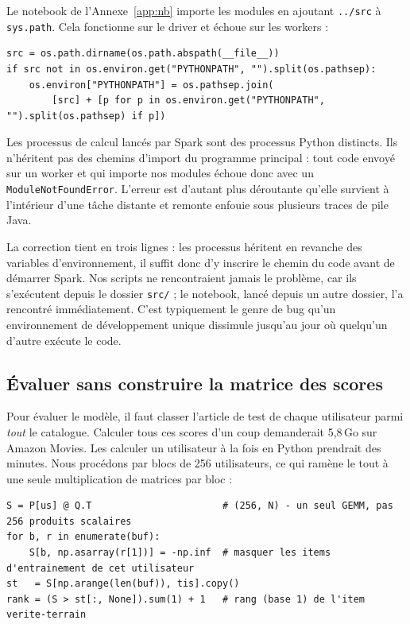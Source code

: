 \documentclass[11pt,a4paper]{article}
\begin{document}
Le notebook de l'Annexe~\ref{app:nb} importe les modules en ajoutant \texttt{../src}
à \texttt{sys.path}. Cela fonctionne sur le driver et échoue sur les workers :

\begin{lstlisting}[caption={\texttt{spark\_utils.get\_spark} - trois lignes sans
lesquelles rien ne fonctionne en dehors de \texttt{src/}.}]
src = os.path.dirname(os.path.abspath(__file__))
if src not in os.environ.get("PYTHONPATH", "").split(os.pathsep):
    os.environ["PYTHONPATH"] = os.pathsep.join(
        [src] + [p for p in os.environ.get("PYTHONPATH", "").split(os.pathsep) if p])
\end{lstlisting}

Les processus de calcul lancés par Spark sont des processus Python distincts. Ils
n'héritent pas des chemins d'import du programme principal : tout code envoyé sur un
worker et qui importe nos modules échoue donc avec un \texttt{ModuleNotFoundError}.
L'erreur est d'autant plus déroutante qu'elle survient à l'intérieur d'une tâche
distante et remonte enfouie sous plusieurs traces de pile Java.

La correction tient en trois lignes : les processus héritent en revanche des variables
d'environnement, il suffit donc d'y inscrire le chemin du code avant de démarrer Spark.
Nos scripts ne rencontraient jamais le problème, car ils s'exécutent depuis le dossier
\texttt{src/} ; le notebook, lancé depuis un autre dossier, l'a rencontré
immédiatement. C'est typiquement le genre de bug qu'un environnement de développement
unique dissimule jusqu'au jour où quelqu'un d'autre exécute le code.

\subsection{Évaluer sans construire la matrice des scores}

Pour évaluer le modèle, il faut classer l'article de test de chaque utilisateur parmi
\emph{tout} le catalogue. Calculer tous ces scores d'un coup demanderait 5,8\,Go sur
Amazon Movies. Les calculer un utilisateur à la fois en Python prendrait des minutes.
Nous procédons par blocs de 256 utilisateurs, ce qui ramène le tout à une seule
multiplication de matrices par bloc :

\begin{lstlisting}[caption={\texttt{evaluate.\_block\_eval} - classement sur le
catalogue entier, par blocs.}]
S = P[us] @ Q.T                       # (256, N) - un seul GEMM, pas 256 produits scalaires
for b, r in enumerate(buf):
    S[b, np.asarray(r[1])] = -np.inf  # masquer les items d'entrainement de cet utilisateur
st   = S[np.arange(len(buf)), tis].copy()
rank = (S > st[:, None]).sum(1) + 1   # rang (base 1) de l'item verite-terrain
\end{lstlisting}
\end{document}
